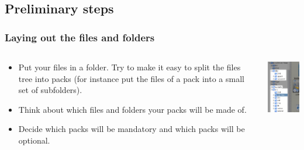 \documentclass{beamer}
\begin{document}
\subsection{Preliminary steps}

\begin{frame}

\frametitle{Laying out the files and folders}

\begin{columns}

  \begin{column}{7cm}
  \begin{itemize}

    \item Put your files in a folder. Try to make it easy to split the
    files tree into packs (for instance put the files of a pack into a small set
    of subfolders).

    \item Think about which files and folders your packs will be made of.

    \item Decide which packs will be mandatory and which packs will be optional.

  \end{itemize}
  \end{column}

  \begin{column}{3cm}
  \includegraphics[width=3cm]{tree-view}
  \end{column}

\end{columns}

\end{frame}

\end{document}
